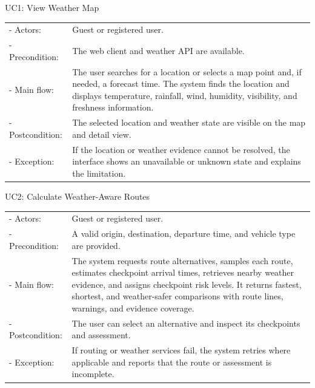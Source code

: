 \newpage
\begin{samepage}
\noindent UC1: View Weather Map\par\medskip
\begin{tabularx}{\textwidth}{@{}p{2.75cm}@{\quad}X@{}}
- Actors: & Guest or registered user. \\
- Precondition: & The web client and weather API are available. \\
- Main flow: & The user searches for a location or selects a map point and, if needed, a forecast time. The system finds the location and displays temperature, rainfall, wind, humidity, visibility, and freshness information. \\
- Postcondition: & The selected location and weather state are visible on the map and detail view. \\
- Exception: & If the location or weather evidence cannot be resolved, the interface shows an unavailable or unknown state and explains the limitation. \\
\end{tabularx}
\medskip
\end{samepage}

\begin{samepage}
\noindent UC2: Calculate Weather-Aware Routes\par\medskip
\begin{tabularx}{\textwidth}{@{}p{2.75cm}@{\quad}X@{}}
- Actors: & Guest or registered user. \\
- Precondition: & A valid origin, destination, departure time, and vehicle type are provided. \\
- Main flow: & The system requests route alternatives, samples each route, estimates checkpoint arrival times, retrieves nearby weather evidence, and assigns checkpoint risk levels. It returns fastest, shortest, and weather-safer comparisons with route lines, warnings, and evidence coverage. \\
- Postcondition: & The user can select an alternative and inspect its checkpoints and assessment. \\
- Exception: & If routing or weather services fail, the system retries where applicable and reports that the route or assessment is incomplete. \\
\end{tabularx}
\medskip
\end{samepage}

